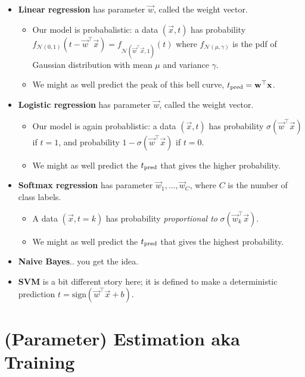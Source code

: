 \documentclass{discussion}
\providecommand{\tightlist}{%
\setlength{\itemsep}{2pt}\setlength{\parskip}{0pt}}
\begin{document}
\begin{itemize}
\item
  \textbf{Linear regression} has parameter \(\vec{w}\), called the
  weight vector.

  \begin{itemize}
  \tightlist
  \item
    Our model is probabalistic: a data \((\vec{x}, t)\) has probability
    \(f_{\mathcal{N}(0,1)}(t - \vec{w}^\top\vec{x}) = f_{\mathcal{N}(\vec{w}^\top\vec{x}, 1)}(t)\)
    where \(f_{\mathcal{N(\mu,\gamma)}}\) is the pdf of Gaussian
    distribution with mean \(\mu\) and variance \(\gamma\).
  \item
    We might as well predict the peak of this bell curve,
    \(t_{\mathrm{pred}} = \mathbf{w}^\top\mathbf{x}\).
  \end{itemize}
\item
  \textbf{Logistic regression} has parameter \(\vec{w}\), called the
  weight vector.

  \begin{itemize}
  \tightlist
  \item
    Our model is again probablistic: a data \((\vec{x}, t)\) has
    probability \(\sigma(\vec{w}^\top\vec{x})\) if \(t = 1\), and
    probability \(1 - \sigma(\vec{w}^\top\vec{x})\) if \(t = 0\).
  \item
    We might as well predict the \(t_{\mathrm{pred}}\) that gives the higher
    probability.
  \end{itemize}
\item
  \textbf{Softmax regression} has parameter
  \(\vec{w}_1, \ldots, \vec{w}_C\), where \(C\) is the number of class
  labels.

  \begin{itemize}
  \tightlist
  \item
    A data \((\vec{x}, t = k)\) has probability \emph{proportional to}
    \(\sigma(\vec{w}_k^\top\vec{x})\).
  \item
    We might as well predict the \(t_{\mathrm{pred}}\) that gives the highest
    probability.
  \end{itemize}
\item
  \textbf{Naive Bayes}.. you get the idea.
\item
  \textbf{SVM} is a bit different story here; it is defined to make a
  deterministic prediction
  \(t = \mathrm{sign}(\vec{w}^\top \vec{x} + b)\).
\end{itemize}

\section{(Parameter) Estimation aka
Training}\label{parameter-estimation-aka-training}
\end{document}
